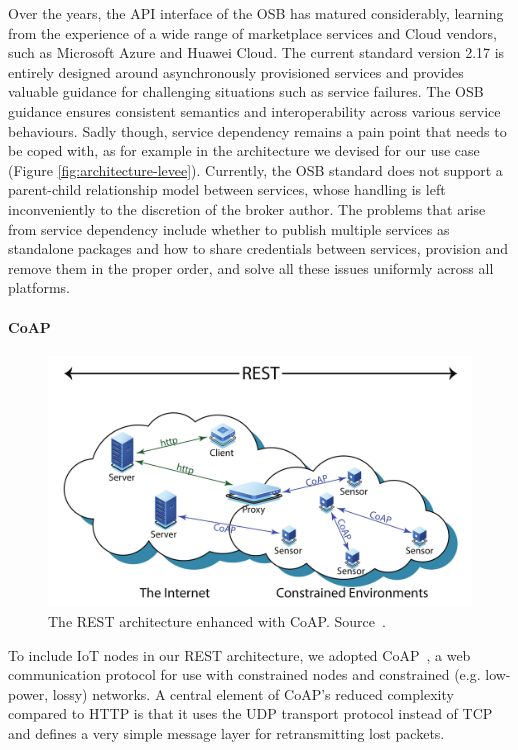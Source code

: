 Over the years, the API interface of the OSB has matured considerably, learning from the experience of a wide range of marketplace services and Cloud vendors, such as Microsoft Azure and Huawei Cloud. The current standard version 2.17 is entirely designed around asynchronously provisioned services and provides valuable guidance for challenging situations such as service failures. 
The OSB guidance ensures consistent semantics and interoperability across various service behaviours.
Sadly though, service dependency remains a pain point that needs to be coped with, as for example in the architecture we devised for our use case (Figure \ref{fig:architecture-levee}). 
Currently, the OSB standard does not support a parent-child relationship model between services, whose handling is left inconveniently to the discretion of the broker author. 
The problems that arise from service dependency include whether to publish multiple services as standalone packages and how to share credentials between services, provision and remove them in the proper order, and solve all these issues uniformly across all platforms.

\paragraph{CoAP}\label{sec:coap}

\begin{figure}[ht]
\centering
\includegraphics[width=0.6\columnwidth]{figures/coap}
\caption{The REST architecture enhanced with CoAP. Source~\cite{bormann2012coap}.}
\label{fig:coap}
\end{figure}

To include IoT nodes in our REST architecture, we adopted CoAP~\cite{bormann2012coap}, a web communication protocol for use with constrained nodes and constrained (e.g. low-power, lossy) networks. A central element of CoAP's reduced complexity compared to HTTP is that it uses the UDP transport protocol instead of TCP and defines a very simple message layer for retransmitting lost packets.

